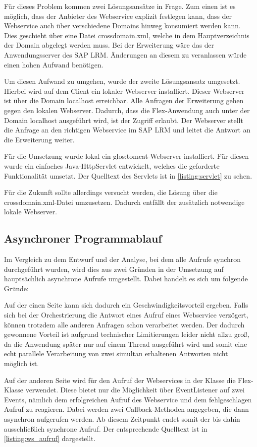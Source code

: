 \begin{onehalfspacing}
Für dieses Problem kommen zwei Lösungsansätze in Frage. Zum einen ist es möglich, dass der Anbieter des Webservice explizit festlegen kann, dass der Webservice auch über verschiedene Domains hinweg konsumiert werden kann. Dies geschieht über eine Datei crossdomain.xml, welche in dem Hauptverzeichnis der Domain abgelegt werden muss. Bei der Erweiterung wäre das der Anwendungsserver des SAP LRM. Änderungen an diesem zu veranlassen würde einen hohen Aufwand benötigen. 

Um diesen Aufwand zu umgehen, wurde der zweite Lösungsansatz umgesetzt. Hierbei wird auf dem Client ein lokaler Webserver installiert. Dieser Webserver ist über die Domain localhost erreichbar. Alle Anfragen der Erweiterung gehen gegen den lokalen Webserver. Dadurch, dass die Flex-Anwendung auch unter der Domain localhost ausgeführt wird, ist der Zugriff erlaubt. Der Webserver stellt die Anfrage an den richtigen Webservice im SAP LRM und leitet die Antwort an die Erweiterung weiter.

Für die Umsetzung wurde lokal ein \gls{glos:tomcat}-Webserver installiert. Für diesen wurde ein einfaches Java-HttpServlet entwickelt, welches die geforderte Funktionalität umsetzt. Der Quelltext des Servlets ist in \vref{listing:servlet} zu sehen.

Für die Zukunft sollte allerdings versucht werden, die Lösung über die crossdomain.xml-Datei umzusetzen. Dadurch entfällt der zusätzlich notwendige lokale Webserver.

\subsection{Asynchroner Programmablauf}
\label{sec:asynchron}
Im Vergleich zu dem Entwurf und der Analyse, bei dem alle Aufrufe synchron durchgeführt wurden, wird dies aus zwei Gründen in der Umsetzung auf hauptsächlich asynchrone Aufrufe umgestellt. Dabei handelt es sich um folgende Gründe:

Auf der einen Seite kann sich dadurch ein Geschwindigkeitsvorteil ergeben. Falls sich bei der Orchestrierung die Antwort eines Aufruf eines Webservice verzögert, können trotzdem alle anderen Anfragen schon verarbeitet werden. Der dadurch gewonnene Vorteil ist aufgrund technischer Limitierungen leider nicht allzu groß, da die Anwendung später nur auf einem Thread ausgeführt wird und somit eine echt parallele Verarbeitung von zwei simultan erhaltenen Antworten nicht möglich ist. 

Auf der anderen Seite wird für den Aufruf der Webservices in der Klasse  die Flex-Klasse  verwendet. Diese bietet nur die Möglichkeit über EventListener auf zwei Events, nämlich dem erfolgreichen Aufruf des Webservice und dem fehlgeschlagen Aufruf zu reagieren. Dabei werden zwei Callback-Methoden angegeben, die dann asynchron aufgerufen werden. Ab diesem Zeitpunkt endet somit der bis dahin ausschließlich synchrone Aufruf. Der entsprechende Quelltext ist in \vref{listing:ws_aufruf} dargestellt.


\end{onehalfspacing}
